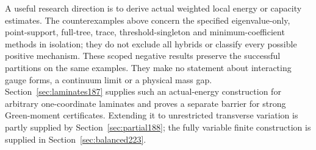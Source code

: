 A useful research direction is to derive actual weighted local energy
or capacity estimates. The counterexamples above concern the specified
eigenvalue-only, point-support, full-tree, trace, threshold-singleton and
minimum-coefficient methods in isolation; they do not exclude all hybrids
or classify every possible positive mechanism. These scoped negative results preserve the
successful partitions on the same examples. They make no statement about
interacting gauge forms, a continuum limit or a physical mass gap.
Section~\ref{sec:laminates187} supplies such an actual-energy construction
for arbitrary one-coordinate laminates and proves a separate barrier for
strong Green-moment certificates. Extending it to unrestricted transverse
variation is partly supplied by Section~\ref{sec:partial188}; the fully variable finite construction is supplied in Section~\ref{sec:balanced223}.

